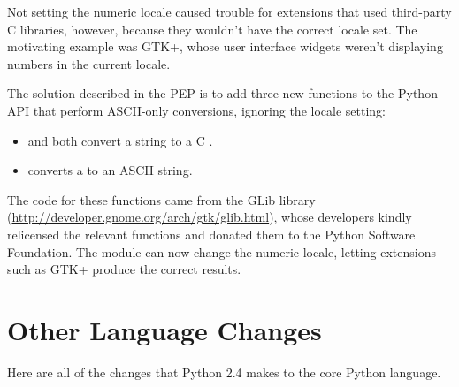 \documentclass{howto}
\begin{document}
Not setting the numeric locale caused trouble for extensions that used
third-party C libraries, however, because they wouldn't have the
correct locale set.  The motivating example was GTK+, whose user
interface widgets weren't displaying numbers in the current locale.

The solution described in the PEP is to add three new functions to the
Python API that perform ASCII-only conversions, ignoring the locale
setting:

\begin{itemize}
 \item {} 
and  
both convert a string to a C .
 \item {} converts a  to an ASCII string.
\end{itemize}

The code for these functions came from the GLib library
(\url{http://developer.gnome.org/arch/gtk/glib.html}), whose
developers kindly relicensed the relevant functions and donated them
to the Python Software Foundation.  The  module 
can now change the numeric locale, letting extensions such as GTK+ 
produce the correct results.

\begin{seealso}
\end{seealso}      

\section{Other Language Changes}

Here are all of the changes that Python 2.4 makes to the core Python
language.
\end{document}
